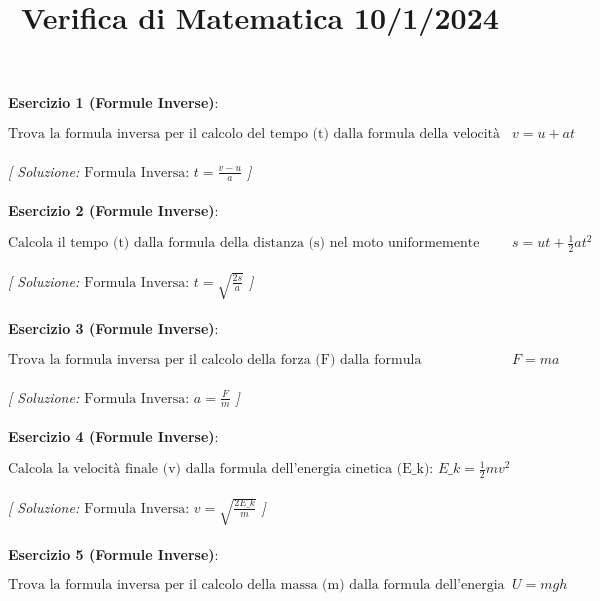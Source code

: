\documentclass{article}
\title{\raggedright Verifica di Matematica  10/1/2024}
\date{}
\begin{document}
\maketitle

\textbf{Esercizio 1 (Formule Inverse)}:\\
\par $\text{Trova la formula inversa per il calcolo del tempo (t) dalla formula della velocit\`a (v) nel moto uniformemente accelerato: } v = u + at$ \\\\

\textit{[ Soluzione: $\text{Formula Inversa: } t = \frac{v - u}{a}$ ]}\\\\

\textbf{Esercizio 2 (Formule Inverse)}:\\
\par $\text{Calcola il tempo (t) dalla formula della distanza (s) nel moto uniformemente accelerato: } s = ut + \frac{1}{2}at^2$ \\\\

\textit{[ Soluzione: $\text{Formula Inversa: } t = \sqrt{\frac{2s}{a}}$ ]}\\\\

\textbf{Esercizio 3 (Formule Inverse)}:\\
\par $\text{Trova la formula inversa per il calcolo della forza (F) dalla formula dell'accelerazione (a) nel secondo principio della dinamica: } F = ma$ \\\\

\textit{[ Soluzione: $\text{Formula Inversa: } a = \frac{F}{m}$ ]}\\\\

\textbf{Esercizio 4 (Formule Inverse)}:\\
\par $\text{Calcola la velocit\`a finale (v) dalla formula dell'energia cinetica (E\_k): } E\_k = \frac{1}{2}mv^2$ \\\\

\textit{[ Soluzione: $\text{Formula Inversa: } v = \sqrt{\frac{2E\_k}{m}}$ ]}\\\\

\textbf{Esercizio 5 (Formule Inverse)}:\\
\par $\text{Trova la formula inversa per il calcolo della massa (m) dalla formula dell'energia potenziale gravitazionale (U): } U = mgh$ \\\\
\end{document}
